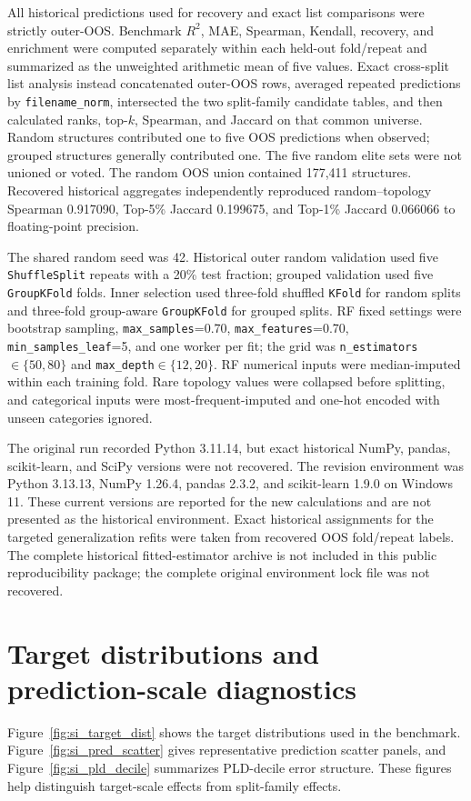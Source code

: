 \documentclass[11pt,a4paper]{article}
\begin{document}
All historical predictions used for recovery and exact list comparisons were strictly outer-OOS. Benchmark $R^2$, MAE, Spearman, Kendall, recovery, and enrichment were computed separately within each held-out fold/repeat and summarized as the unweighted arithmetic mean of five values. Exact cross-split list analysis instead concatenated outer-OOS rows, averaged repeated predictions by \texttt{filename\_norm}, intersected the two split-family candidate tables, and then calculated ranks, top-$k$, Spearman, and Jaccard on that common universe. Random structures contributed one to five OOS predictions when observed; grouped structures generally contributed one. The five random elite sets were not unioned or voted. The random OOS union contained 177,411 structures. Recovered historical aggregates independently reproduced random--topology Spearman 0.917090, Top-5\% Jaccard 0.199675, and Top-1\% Jaccard 0.066066 to floating-point precision.

The shared random seed was 42. Historical outer random validation used five \texttt{ShuffleSplit} repeats with a 20\% test fraction; grouped validation used five \texttt{GroupKFold} folds. Inner selection used three-fold shuffled \texttt{KFold} for random splits and three-fold group-aware \texttt{GroupKFold} for grouped splits. RF fixed settings were bootstrap sampling, \texttt{max\_samples}=0.70, \texttt{max\_features}=0.70, \texttt{min\_samples\_leaf}=5, and one worker per fit; the grid was \texttt{n\_estimators}$\in\{50,80\}$ and \texttt{max\_depth}$\in\{12,20\}$. RF numerical inputs were median-imputed within each training fold. Rare topology values were collapsed before splitting, and categorical inputs were most-frequent-imputed and one-hot encoded with unseen categories ignored.

The original run recorded Python 3.11.14, but exact historical NumPy, pandas, scikit-learn, and SciPy versions were not recovered. The revision environment was Python 3.13.13, NumPy 1.26.4, pandas 2.3.2, and scikit-learn 1.9.0 on Windows 11. These current versions are reported for the new calculations and are not presented as the historical environment. Exact historical assignments for the targeted generalization refits were taken from recovered OOS fold/repeat labels. The complete historical fitted-estimator archive is not included in this public reproducibility package; the complete original environment lock file was not recovered.

\section[Target and prediction-scale diagnostics]{Target distributions and prediction-scale diagnostics}
Figure~\ref{fig:si_target_dist} shows the target distributions used in the benchmark. Figure~\ref{fig:si_pred_scatter} gives representative prediction scatter panels, and Figure~\ref{fig:si_pld_decile} summarizes PLD-decile error structure. These figures help distinguish target-scale effects from split-family effects.
\end{document}

